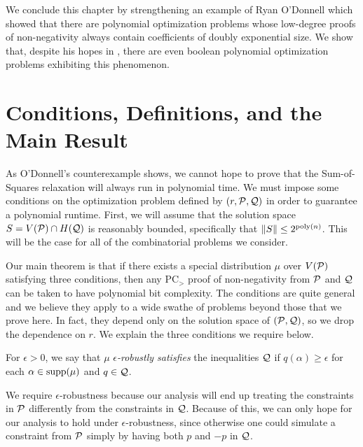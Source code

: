 We conclude this chapter by strengthening an example of Ryan O'Donnell which showed that there are polynomial optimization problems whose low-degree proofs of non-negativity always contain coefficients of doubly exponential size. We show that, despite his hopes in \cite{ODon16}, there are even boolean polynomial optimization problems exhibiting this phenomenon. 

\section{Conditions, Definitions, and the Main Result}
As O'Donnell's counterexample shows, we cannot hope to prove that the Sum-of-Squares relaxation will always run in polynomial time. We must impose some conditions on the optimization problem defined by $(r, \mathcal P, \mathcal Q)$ in order to guarantee a polynomial runtime. First, we will assume that the solution space $S = V(\mathcal P) \cap H(\mathcal Q)$ is reasonably bounded, specifically that $\|S\| \leq 2^{\operatorname{poly}(n)}$. This will be the case for all of the combinatorial problems we consider.

Our main theorem is that if there exists a special distribution $\mu$ over $V(\mathcal P)$ satisfying three conditions, then any PC$_>$ proof of non-negativity from $\mathcal P$ and $\mathcal Q$ can be taken to have polynomial bit complexity. The conditions are quite general and we believe they apply to a wide swathe of problems beyond those that we prove here. In fact, they depend only on the solution space of $(\mathcal P, \mathcal Q)$, so we drop the dependence on $r$. We explain the three conditions we require below.

\begin{definition}
For $\epsilon > 0$, we say that $\mu$ \emph{$\epsilon$-robustly satisfies} the inequalities $\mathcal Q$ if $q(\alpha) \geq \epsilon$ for each $\alpha \in \operatorname{supp}(\mu)$ and $q \in \mathcal Q$. 
\end{definition}
We require $\epsilon$-robustness because our analysis will end up treating the constraints in $\mathcal P$ differently from the constraints in $\mathcal Q$.
Because of this, we can only hope for our analysis to hold under $\epsilon$-robustness, since otherwise one could simulate a constraint from $\mathcal P$ simply by having both $p$ and $-p$ in $\mathcal Q$. 

